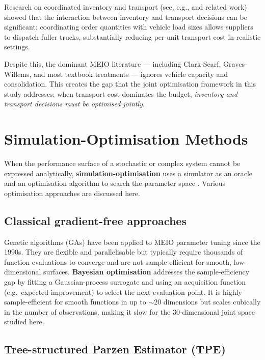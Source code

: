 Research on coordinated inventory and transport (see, e.g.,
\citealt{JagermanEtAl1990} and related work) showed that the
interaction between inventory and transport decisions can be significant:
coordinating order quantities with vehicle load sizes allows suppliers
to dispatch fuller trucks, substantially reducing per-unit transport
cost in realistic settings.

Despite this, the dominant MEIO literature --- including Clark-Scarf,
Graves-Willems, and most textbook treatments --- ignores vehicle capacity
and consolidation.  This creates the gap that the joint optimisation
framework in this study addresses: when transport cost dominates the budget,
\emph{inventory and transport decisions must be optimised jointly}.

\section{Simulation-Optimisation Methods}
\label{sec:lit:simopt}

When the performance surface of a stochastic or complex system cannot be
expressed analytically, \textbf{simulation-optimisation} uses a simulator
as an oracle and an optimisation algorithm to search the parameter space
\citep{FuEtAl2005}. Various optimisation approaches are discussed here.

\subsection{Classical gradient-free approaches}

Genetic algorithms (GAs) \citep{Goldberg1989} have been applied to MEIO
parameter tuning since the 1990s.  They are flexible and parallelisable
but typically require thousands of function evaluations to converge and
are not sample-efficient for smooth, low-dimensional surfaces.
\textbf{Bayesian optimisation} \citep{ShahriariEtAl2016} addresses the
sample-efficiency gap by fitting a Gaussian-process surrogate and using an
acquisition function (e.g.\ expected improvement) to select the next
evaluation point.  It is highly sample-efficient for smooth functions in up
to $\sim\!20$ dimensions but scales cubically in the number of observations,
making it slow for the 30-dimensional joint space studied here.

\subsection{Tree-structured Parzen Estimator (TPE)}

